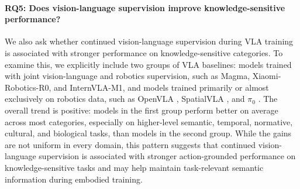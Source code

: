 \documentclass{llmxive}
\providecommand{\arraystretch}{0.95}
\begin{document}
\begin{table}[t]
\centering
\footnotesize
\setlength{\tabcolsep}{4pt}
\renewcommand{\arraystretch}{0.95}
\caption{Averaged probing-based retention metrics by model. VLM and Action report the maximum probing accuracies over backbone and Action Part layers, respectively.}
\label{tab:cnr_car}
\end{table}

\paragraph{RQ5: Does vision-language supervision improve knowledge-sensitive performance?}
We also ask whether continued vision-language supervision during VLA training is associated with stronger performance on knowledge-sensitive categories. To examine this, we explicitly include two groups of VLA baselines: models trained with joint vision-language and robotics supervision, such as Magma, Xiaomi-Robotics-R0, and InternVLA-M1, and models trained primarily or almost exclusively on robotics data, such as OpenVLA \citep{openvla}, SpatialVLA \citep{spatialvla}, and $\pi_0$ \citep{pi0}. The overall trend is positive: models in the first group perform better on average across most categories, especially on higher-level semantic, temporal, normative, cultural, and biological tasks, than models in the second group. While the gains are not uniform in every domain, this pattern suggests that continued vision-language supervision is associated with stronger action-grounded performance on knowledge-sensitive tasks and may help maintain task-relevant semantic information during embodied training.
\end{document}
